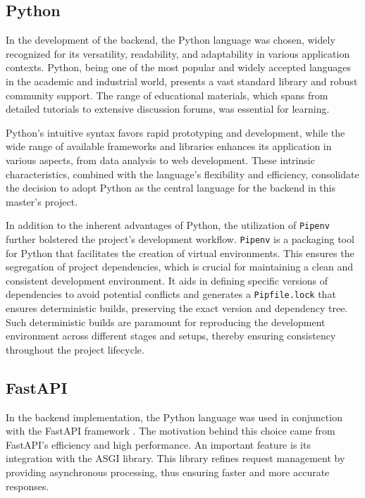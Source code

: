\subsection{Python}
In the development of the backend, the Python language \cite{pythonOfficialDocs} was chosen, widely recognized for its versatility, readability, and adaptability in various application contexts. Python, being one of the most popular and widely accepted languages in the academic and industrial world, presents a vast standard library and robust community support. The range of educational materials, which spans from detailed tutorials to extensive discussion forums, was essential for learning.

Python's intuitive syntax favors rapid prototyping and development, while the wide range of available frameworks and libraries enhances its application in various aspects, from data analysis to web development. These intrinsic characteristics, combined with the language's flexibility and efficiency, consolidate the decision to adopt Python as the central language for the backend in this master's project.

In addition to the inherent advantages of Python, the utilization of \texttt{Pipenv} \cite{pipenvOfficialDocs} further bolstered the project's development workflow. \texttt{Pipenv} is a packaging tool for Python that facilitates the creation of virtual environments. This ensures the segregation of project dependencies, which is crucial for maintaining a clean and consistent development environment. It aids in defining specific versions of dependencies to avoid potential conflicts and generates a \texttt{Pipfile.lock} that ensures deterministic builds, preserving the exact version and dependency tree. Such deterministic builds are paramount for reproducing the development environment across different stages and setups, thereby ensuring consistency throughout the project lifecycle.

\subsection{FastAPI}
In the backend implementation, the Python language was used in conjunction with the FastAPI framework \cite{fastapiDocs}. The motivation behind this choice came from FastAPI's efficiency and high performance. An important feature is its integration with the \gls{ASGI} library. This library refines request management by providing asynchronous processing, thus ensuring faster and more accurate responses.

